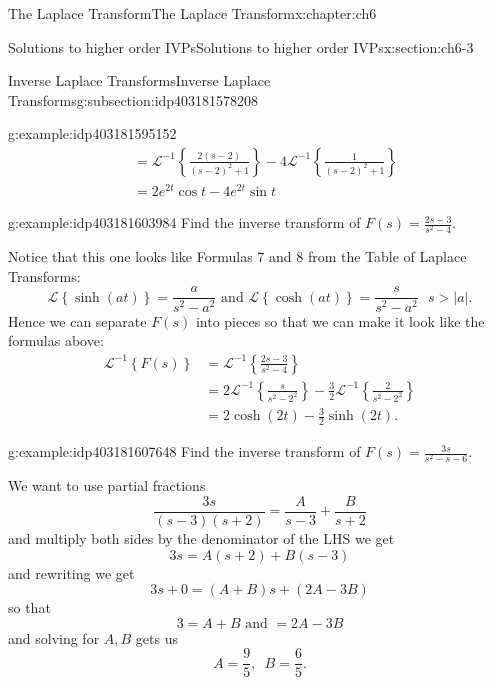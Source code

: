 \documentclass[oneside,10pt,]{book}
\numberwithin{equation}{section}
\numberwithin{equation}{section}
\newcommand{\amp}{&}
\begin{document}
\begin{chapterptx}{The Laplace Transform}{}{The Laplace Transform}{}{}{x:chapter:ch6}
\begin{sectionptx}{Solutions to higher order IVPs}{}{Solutions to higher order IVPs}{}{}{x:section:ch6-3}
\begin{subsectionptx}{Inverse Laplace Transforms}{}{Inverse Laplace Transforms}{}{}{g:subsection:idp403181578208}
\begin{example}{}{g:example:idp403181595152}
\begin{align*}
\amp =\mathcal{L}^{-1}\left\{ \frac{2\left(s-2\right)}{\left(s-2\right)^{2}+1}\right\} -4\mathcal{L}^{-1}\left\{ \frac{1}{\left(s-2\right)^{2}+1}\right\} \\
\amp =2e^{2t}\cos t-4e^{2t}\sin t
\end{align*}
%
\end{example}
\begin{example}{}{g:example:idp403181603984}%
Find the inverse transform of \(F(s)=\frac{2s-3}{s^{2}-4}\).%
\par
Notice that this one looks like Formulas 7 and 8 from the Table of Laplace Transforms:%
\begin{equation*}
\mathcal{L}\left\{ \sinh(at)\right\} =\frac{a}{s^{2}-a^{2}}\text{ and }\mathcal{L}\left\{ \cosh\left(at\right)\right\} =\frac{s}{s^{2}-a^{2}}\,\,\,\,s>\left|a\right|.
\end{equation*}
Hence we can separate \(F(s)\) into pieces so that we can make it look like the formulas above:%
\begin{align*}
\mathcal{L}^{-1}\left\{ F(s)\right\}  \amp =\mathcal{L}^{-1}\left\{ \frac{2s-3}{s^{2}-4}\right\} \\
\amp =2\mathcal{L}^{-1}\left\{ \frac{s}{s^{2}-2^{2}}\right\} -\frac{3}{2}\mathcal{L}^{-1}\left\{ \frac{2}{s^{2}-2^{2}}\right\} \\
\amp =2\cosh\left(2t\right)-\frac{3}{2}\sinh\left(2t\right).
\end{align*}
%
\end{example}
\begin{example}{}{g:example:idp403181607648}%
Find the inverse transform of \(F(s)=\frac{3s}{s^{2}-s-6}\).%
\par
We want to use partial fractions%
\begin{equation*}
\frac{3s}{(s-3)(s+2)}=\frac{A}{s-3}+\frac{B}{s+2}
\end{equation*}
and multiply both sides by the denominator of the LHS we get%
\begin{equation*}
3s=A\left(s+2\right)+B\left(s-3\right)
\end{equation*}
and rewriting we get%
\begin{equation*}
3s+0=\left(A+B\right)s+\left(2A-3B\right)
\end{equation*}
so that%
\begin{equation*}
3=A+B\text{ and }=2A-3B
\end{equation*}
and solving for \(A,B\) gets us%
\begin{equation*}
A=\frac{9}{5},\,\,\,B=\frac{6}{5}.
\end{equation*}

\end{example}
\end{subsectionptx}
\end{sectionptx}
\end{chapterptx}
\end{document}
